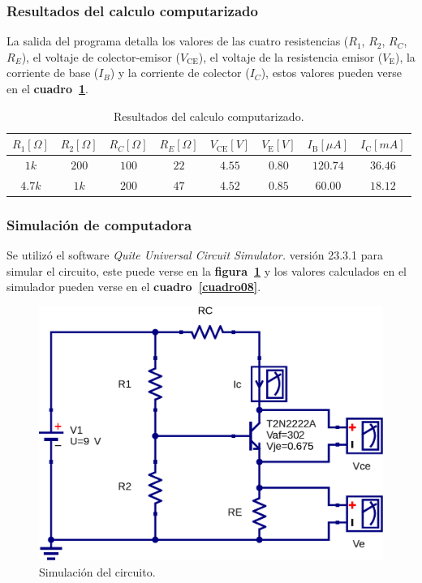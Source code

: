 \subsubsection{Resultados del calculo computarizado}
La salida del programa detalla los valores de las cuatro resistencias ($R_1$,
$R_2$, $R_C$, $R_E$), el voltaje de colector-emisor ($V_{\text{CE}}$), el
voltaje de la resistencia emisor ($V_{\text{E}}$), la corriente de base ($I_B$)
y la corriente de colector ($I_C$), estos valores pueden verse en el
\textbf{cuadro~\ref{cuadro07}}.

\begin{table}[!h]
\begin{center}
    \begin{tabular}{|c|c|c|c||c|c||c|c|}
    \hline
    $R_1[\Omega]$ & $R_2[\Omega]$ & $R_C[\Omega]$ & $R_E[\Omega]$ &
    $V_{\text{CE}}[V]$ & $V_{\text{E}}[V]$ &
    $I_{\text{B}}[\mu{A}]$ & $I_{\text{C}}[mA]$
    \tabularnewline \hline \hline
    $  1k$ & $ 200$ & $100$ & $22$ & $4.55$ & $0.80$ & $120.74$ & $36.46$ \tabularnewline \hline
    $4.7k$ & $  1k$ & $200$ & $47$ & $4.52$ & $0.85$ & $ 60.00$ & $18.12$ \tabularnewline \hline
    \end{tabular}
\end{center}
\caption{Resultados del calculo computarizado.}
\label{cuadro07}
\end{table}

\subsubsection{Simulación de computadora}
Se utilizó el software \emph{Quite Universal Circuit Simulator.} versión 23.3.1
para simular el circuito, este puede verse en la
\textbf{figura~\ref{figura12}} y los valores calculados en el simulador pueden
verse en el \textbf{cuadro~\ref{cuadro08}}.

\begin{figure}[!h]
\centering
\includegraphics[scale=0.54]{diagramas/figura12.eps}
\caption{Simulación del circuito.}
\label{figura12}
\end{figure}

